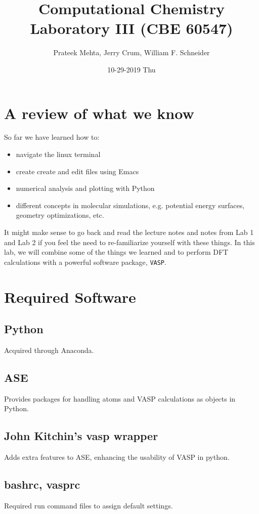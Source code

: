 \documentclass[11pt]{article}
\author{Prateek Mehta, Jerry Crum,  William F. Schneider}
\date{10-29-2019 Thu}
\title{Computational Chemistry Laboratory III (CBE 60547)}
\begin{document}
\maketitle


\section{A review of what we know}
\label{sec:orgca3ecfe}

So far we have learned how to:

\begin{itemize}
\item navigate the linux terminal

\item create create and edit files using Emacs

\item numerical analysis and plotting with Python

\item different concepts in molecular simulations, e.g. potential energy surfaces, geometry optimizations, etc.
\end{itemize}

It might make sense to go back and read the lecture notes and notes from Lab 1 and Lab 2 if you feel the need to re-familiarize yourself with these things. In this lab, we will combine some of the things we learned and to perform DFT calculations with a powerful software package, \texttt{VASP}. 


\section{Required Software}
\label{sec:org71c4077}
\subsection{Python}
\label{sec:org386bf34}
Acquired through Anaconda.
\subsection{ASE}
\label{sec:orge5f699f}
Provides packages for handling atoms and VASP calculations as objects in Python. 
\subsection{John Kitchin's vasp wrapper}
\label{sec:org44d4bc7}
Adds extra features to ASE, enhancing the usability of VASP in python.
\subsection{bashrc, vasprc}
\label{sec:org105bb0c}
Required run command files to assign default settings. 
\end{document}

